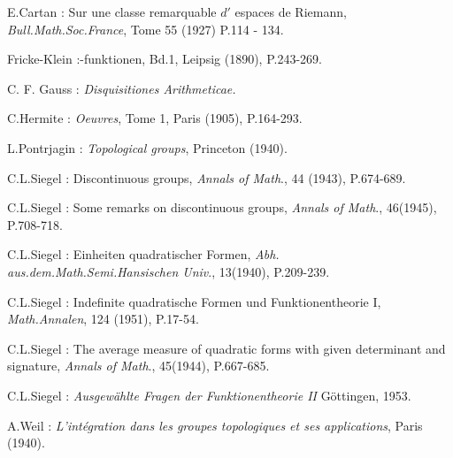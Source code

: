 \begin{thebibliography}{99}
  E.\@ Cartan : Sur une classe remarquable $d'$
  espaces de Riemann, 
{\em Bull.\@ Math.\@ Soc.\@ France}, Tome 55 (1927) P.\@ 114 -
134.

 Fricke-Klein :-funktionen, Bd.1, Leipsig (1890), P.243-269.

 C. F. Gauss :  {\em Disquisitiones Arithmeticae.}

 C.\@ Hermite : {\em Oeuvres}, Tome 1, Paris (1905),
P.164-293.

 L.\@ Pontrjagin :  {\em Topological groups}, Princeton
(1940).

 C.\@ L.\@ Siegel :  Discontinuous groups, {\em Annals
  of Math}., 44 (1943), P.\@ 674-689.

 C.\@ L.\@ Siegel :  Some remarks on discontinuous groups, {\em
  Annals of Math}., 46(1945), P.708-718.

 C.\@ L.\@ Siegel :  Einheiten quadratischer Formen, {\em Abh.\@
  aus.\@ dem.\@ Math.\@ Semi.\@ Hansischen Univ}., 13(1940),
P.209-239.

 C.\@ L.\@ Siegel : Indefinite quadratische Formen und
Funktionentheorie I, {\em Math.\@ Annalen}, 124 (1951),
P.17-54.

 C.\@ L.\@ Siegel :  The average measure of quadratic forms with
given determinant and signature, {\em Annals of Math}., 45(1944),
P.667-685.

 C.\@ L.\@ Siegel :  {\em Ausgew\"ahlte Fragen der
  Funktionentheorie II} G\"ottingen, 1953.

 A.\@ Weil : {\em L'int\'egration dans les groupes topologiques
  et ses applications}, Paris (1940).  
\end{thebibliography}
